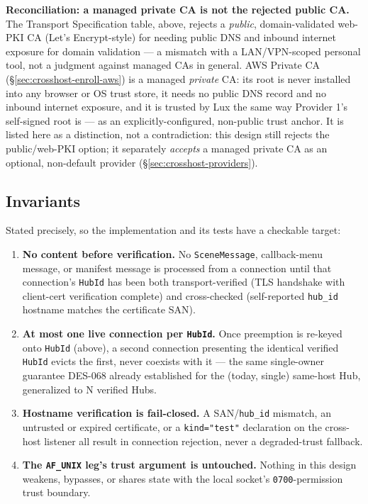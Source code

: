 \documentclass[a4paper,10pt]{article}
\newcommand{\msg}[1]{\texttt{#1}}
\newcommand{\field}[1]{\texttt{#1}}
\begin{document}
\textbf{Reconciliation: a managed private CA is not the rejected public
CA.}  The Transport Specification table, above, rejects a \emph{public},
domain-validated web-PKI CA (Let's Encrypt-style) for needing public DNS
and inbound internet exposure for domain validation --- a mismatch with a
LAN/VPN-scoped personal tool, not a judgment against managed CAs in
general.  AWS Private CA (\S\ref{sec:crosshost-enroll-aws}) is a managed
\emph{private} CA: its root is never installed into any browser or OS
trust store, it needs no public DNS record and no inbound internet
exposure, and it is trusted by Lux the same way Provider 1's self-signed
root is --- as an explicitly-configured, non-public trust anchor.  It is
listed here as a distinction, not a contradiction: this design still
rejects the public/web-PKI option; it separately \emph{accepts} a managed
private CA as an optional, non-default provider
(\S\ref{sec:crosshost-providers}).

\subsection{Invariants}\label{sec:crosshost-invariants}

Stated precisely, so the implementation and its tests have a checkable
target:

\begin{enumerate}
  \item \textbf{No content before verification.}  No \msg{SceneMessage},
    callback-menu message, or manifest message is processed from a
    connection until that connection's \texttt{HubId} has been both
    transport-verified (TLS handshake with client-cert verification
    complete) and cross-checked (self-reported \field{hub\_id} hostname
    matches the certificate SAN).
  \item \textbf{At most one live connection per \texttt{HubId}.}  Once
    preemption is re-keyed onto \texttt{HubId} (above), a second
    connection presenting the identical verified \texttt{HubId} evicts
    the first, never coexists with it --- the same single-owner guarantee
    DES-068 already established for the (today, single) same-host Hub,
    generalized to N verified Hubs.
  \item \textbf{Hostname verification is fail-closed.}  A SAN/\field{hub\_id}
    mismatch, an untrusted or expired certificate, or a
    \texttt{kind="test"} declaration on the cross-host listener all result
    in connection rejection, never a degraded-trust fallback.
  \item \textbf{The \field{AF\_UNIX} leg's trust argument is untouched.}
    Nothing in this design weakens, bypasses, or shares state with the
    local socket's \texttt{0700}-permission trust boundary.
\end{enumerate}
\end{document}
